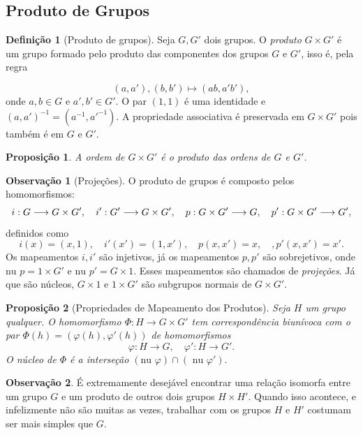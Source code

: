 \documentclass[a4paper,12pt]{report}
\theoremstyle{plain}
\newtheorem{proposicao}{Proposição}[section]
\theoremstyle{definition}
\newtheorem{definicao}{Definição}[section]
\newtheorem{observacao}{Observação}[section]
\begin{document}
\subsection{Produto de Grupos}

\begin{definicao}[Produto de grupos]
	Seja \(G,G'\) dois grupos. O \emph{produto}
	\(G\times G'\) é um grupo formado pelo produto das componentes dos
	grupos \(G\) e \(G'\), isso é, pela regra
	
	\[ (a,a'), (b,b') \mapsto (ab,a'b'), \] onde \(a,b \in G\) e
	\(a',b'\in G'\). O par \((1,1)\) é uma identidade e
	\((a,a')^{-1} = (a^{-1},a'^{-1})\). A propriedade associativa é
	preservada em \(G\times G'\) pois também é em \(G\) e \(G'\).
\end{definicao}

\begin{proposicao}
	A ordem de \(G\times G'\) é o produto das ordens de
	\(G\) e \(G'\).	
\end{proposicao}

\begin{observacao}[Projeções]
	O produto de grupos é composto pelos homomorfismos:
	\[i: G\longrightarrow G\times G', \quad i': G'\longrightarrow G\times G', \newline \quad p: G\times G'\longrightarrow G, \quad p': G\times G'\longrightarrow G',\]
	definidos como
	\[i(x) = (x,1), \quad i'(x') = (1,x'), \quad p(x,x') = x, \quad, p'(x,x') = x'.\]
	Os mapeamentos \(i,i'\) são injetivos, já os mapeamentos \(p,p'\) são
	sobrejetivos, onde \(\text{nu }p = 1\times G'\) e
	\(\text{nu }p' = G\times 1\). Esses mapeamentos são chamados de
	\emph{projeções}. Já que são núcleos, \(G\times 1\) e \(1\times G'\)
	são subgrupos normais de \(G\times G'\).
\end{observacao}

\begin{proposicao}[Propriedades de Mapeamento dos Produtos]
	Seja
	\(H\) um grupo qualquer. O homomorfismo
	\(\Phi: H\longrightarrow G\times G'\) tem correspondência biunívoca com
	o par $ \Phi(h) = (\varphi(h), \varphi'(h))$ de homomorfismos
	\[\varphi:H\longrightarrow G, \quad \varphi': H\longrightarrow G'.\]
	O núcleo de \(\Phi\) é a interseção
	\((\text{nu }\varphi)\cap(\text{ nu }\varphi').\)	
\end{proposicao}

\begin{observacao}
	É extremamente desejável encontrar uma relação isomorfa entre um grupo
	\(G\) e um produto de outros dois grupos \(H\times H'\). Quando isso
	acontece, e infelizmente não são muitas as vezes, trabalhar com os
	grupos \(H\) e \(H'\) costumam ser mais simples que \(G\).
\end{observacao}
\end{document}

